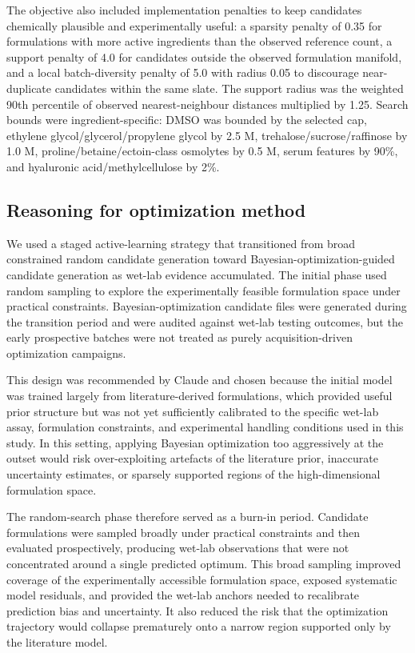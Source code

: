 \documentclass[preprint,12pt]{elsarticle}
\begin{document}
The objective also included implementation penalties to keep candidates chemically plausible and experimentally useful: a sparsity penalty of 0.35 for formulations with more active ingredients than the observed reference count, a support penalty of 4.0 for candidates outside the observed formulation manifold, and a local batch-diversity penalty of 5.0 with radius 0.05 to discourage near-duplicate candidates within the same slate. The support radius was the weighted 90th percentile of observed nearest-neighbour distances multiplied by 1.25. Search bounds were ingredient-specific: DMSO was bounded by the selected cap, ethylene glycol/glycerol/propylene glycol by 2.5 M, trehalose/sucrose/raffinose by 1.0 M, proline/betaine/ectoin-class osmolytes by 0.5 M, serum features by 90\%, and hyaluronic acid/methylcellulose by 2\%.

\subsection{Reasoning for optimization method}

We used a staged active-learning strategy that transitioned from broad constrained random candidate generation toward Bayesian-optimization-guided candidate generation as wet-lab evidence accumulated. The initial phase used random sampling to explore the experimentally feasible formulation space under practical constraints. Bayesian-optimization candidate files were generated during the transition period and were audited against wet-lab testing outcomes, but the early prospective batches were not treated as purely acquisition-driven optimization campaigns.

This design was recommended by Claude and chosen because the initial model was trained largely from literature-derived formulations, which provided useful prior structure but was not yet sufficiently calibrated to the specific wet-lab assay, formulation constraints, and experimental handling conditions used in this study. In this setting, applying Bayesian optimization too aggressively at the outset would risk over-exploiting artefacts of the literature prior, inaccurate uncertainty estimates, or sparsely supported regions of the high-dimensional formulation space.

The random-search phase therefore served as a burn-in period. Candidate formulations were sampled broadly under practical constraints and then evaluated prospectively, producing wet-lab observations that were not concentrated around a single predicted optimum. This broad sampling improved coverage of the experimentally accessible formulation space, exposed systematic model residuals, and provided the wet-lab anchors needed to recalibrate prediction bias and uncertainty. It also reduced the risk that the optimization trajectory would collapse prematurely onto a narrow region supported only by the literature model.
\end{document}

